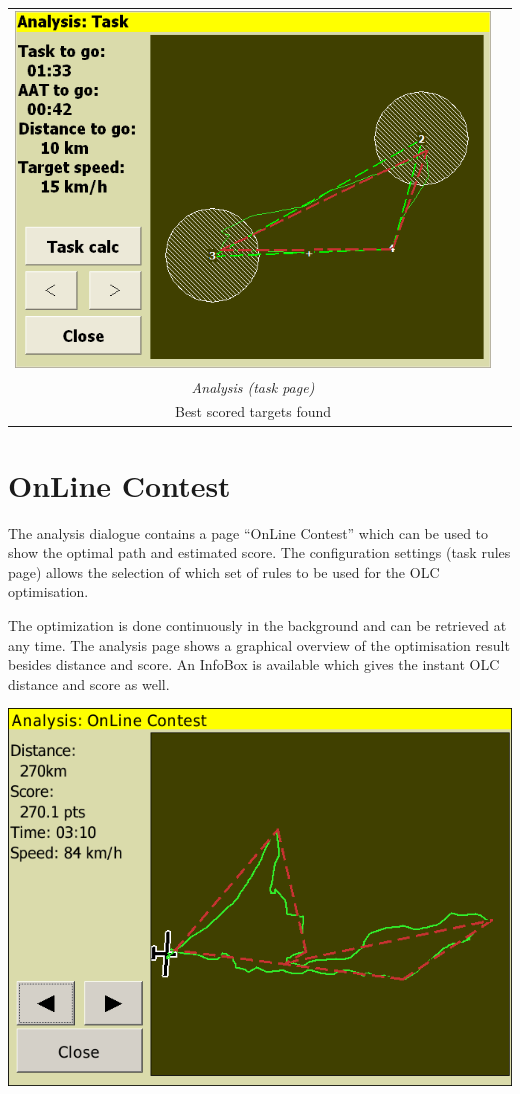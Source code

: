 \begin{maxipage}
\begin{center}
\begin{longtable}{|c|c|}
\midrule
\includegraphics[angle=0,width=0.45\linewidth,keepaspectratio='true']{figures/faat12.png} &  \\
\emph{Analysis (task page)} &  \\
Best scored targets found &  \\

\bottomrule
\end{longtable}
\end{center}
\end{maxipage}

\section{OnLine Contest}

The analysis dialogue contains a page ``OnLine Contest'' which can be
used to show the optimal path and estimated score.  The configuration settings  
(task rules page) allows the selection of which set of rules to be used for the
OLC optimisation.

The optimization is done continuously in the background and can be retrieved at
any time. The analysis page shows a graphical overview of the optimisation
result besides distance and score. An InfoBox is available which gives the
instant OLC distance and score as well.

\begin{center}
\includegraphics[angle=0,width=0.8\linewidth,keepaspectratio='true']{figures/shot-olc.png}
\end{center}

